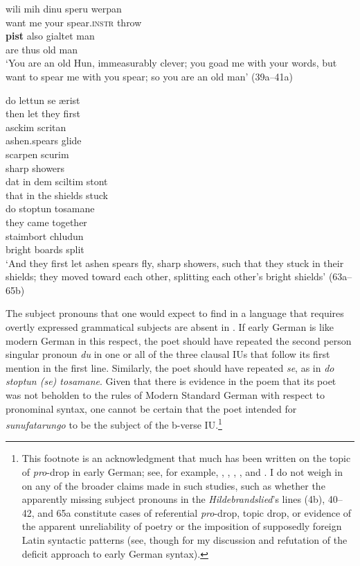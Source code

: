 \gll wili    mih  dinu speru     werpan\\
want   me  your spear.\textsc{instr}  throw\\

\gll  \textbf{pist}  also    gialtet  man\\
are  thus    old     man\\

\glt ‘You are an old Hun, immeasurably clever; you goad me with your words, but want to spear me with you spear; so you are an old man’ (39a--41a)

\ex
\gll do     lettun   se     ærist\\
  then   let     they   first\\

\gll asckim       scritan\\
ashen.spears     glide\\

\gll scarpen    scurim\\
sharp    showers\\

\gll dat   in   dem   sciltim   stont\\
that  in   the    shields   stuck\\

\gll do    stoptun   tosamane\\
they   came   together\\

\gll staimbort     chludun\\
bright boards   split\\
\glt  ‘And they first let ashen spears fly, sharp showers, such that they stuck in their shields; they moved toward each other, splitting each other’s bright shields’ (63a--65b)
    \z
\z

\noindent The subject pronouns that one would expect to find in a language that requires overtly expressed grammatical subjects are absent in . If early German is like modern German in this respect, the poet should have repeated the second person singular pronoun \textit{du} in one or all of the three clausal IUs that follow its first mention in the first line. Similarly, the poet should have repeated \textit{se}, as in \textit{do stoptun (se) tosamane}. Given that there is evidence in the poem that its poet was not beholden to the rules of Modern Standard German with respect to pronominal syntax, one cannot be certain that the poet intended for \textit{sunufatarungo} to be the subject of the b-verse IU.\footnote{{This footnote is an acknowledgment that much has been written on the topic of} {\textit{pro}}{{}-drop in early German; see, for example, \citet{Eggenberger1961}, \citet{Hopper1975}, \citet{Axel2007}, \citet{Axel-Tober2012}, and \citet{Somers2018}. I do not weigh in on any of the broader claims made in such studies, such as whether the apparently missing subject pronouns in the} {\textit{Hildebrandslied}}{’s lines (4b), 40--42, and 65a constitute cases of referential} {\textit{pro}}{{}-drop, topic drop, or evidence of the apparent unreliability of poetry or the imposition of supposedly foreign Latin syntactic patterns (see, though  for my discussion and refutation of the deficit approach to early German syntax).}}

